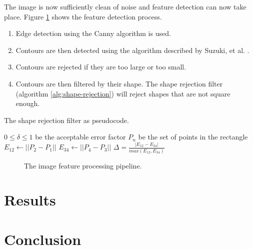 \documentclass[conference]{IEEEtran}
\begin{document}
The image is now sufficiently clean of noise and feature detection can now take place.
Figure \ref{fig:feature-detection} shows the feature detection process.
\begin{enumerate}
	\item Edge detection using the Canny \cite{canny} algorithm is used. %
	\item Contours are then detected using the algorithm described by Suzuki, et al. \cite{Suzuki1985}.
	\item Contours are rejected if they are too large or too small.
	\item Contours are then filtered by their shape. The shape rejection filter (algorithm \ref{alg:shape-rejection}) will reject shapes that are not square enough.
\end{enumerate}
\begin{algorithm}
	\caption{The shape rejection filter as pseudocode.}
	\label{alg:shape-rejection}
	\begin{algorithmic}
		\REQUIRE $0 \leq \delta \leq 1$ be the acceptable error factor
		\REQUIRE $P_n$ be the set of points in the rectangle
		\STATE $E_{12} \leftarrow ||P_2 - P_1||$
		\STATE $E_{34} \leftarrow ||P_4 - P_3||$
		\STATE $\Delta = \frac{|E_{12} - E_{34}|}{max(E_{12}, E_{34})}$
		\IF {$\delta \leq \Delta$} \RETURN \TRUE \ELSE \RETURN \FALSE \ENDIF
	\end{algorithmic}
\end{algorithm}
\begin{figure}
	\centering
	\caption{The image feature processing pipeline.}
	\label{fig:feature-detection}
\end{figure}

\section{Results}

\section{Conclusion}

\printbibliography
\end{document}
